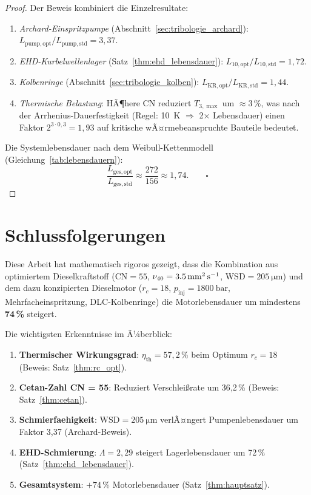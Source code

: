 ﻿\documentclass[12pt,a4paper]{article}
\newcommand{\CN}{\ensuremath{\mathrm{CN}}}
\newcommand{\WSD}{\ensuremath{\mathrm{WSD}}}
\newcommand{\etath}{\ensuremath{\eta_{\mathrm{th}}}}
\newcommand{\rc}{\ensuremath{r_c}}
\begin{document}
\begin{proof}
Der Beweis kombiniert die Einzelresultate:
\begin{enumerate}[label=(\roman*)]
  \item \textit{Archard-Einspritzpumpe} (Abschnitt~\ref{sec:tribologie_archard}):
        $L_{\mathrm{pump,opt}} / L_{\mathrm{pump,std}} = 3{,}37$.
  \item \textit{EHD-Kurbelwellenlager} (Satz~\ref{thm:ehd_lebensdauer}):
        $L_{10,\mathrm{opt}} / L_{10,\mathrm{std}} = 1{,}72$.
  \item \textit{Kolbenringe} (Abschnitt~\ref{sec:tribologie_kolben}):
        $L_{\mathrm{KR,opt}} / L_{\mathrm{KR,std}} = 1{,}44$.
  \item \textit{Thermische Belastung}: HÃ¶here CN reduziert
        $T_{3,\max}$ um $\approx 3\,\%$, was nach der Arrhenius-Dauerfestigkeit
        (Regel: 10~K $\Rightarrow$ 2$\times$ Lebensdauer) einen
        Faktor $2^{3 \cdot 0{,}3} = 1{,}93$ auf kritische
        wÃ¤rmebeanspruchte Bauteile bedeutet.
\end{enumerate}
Die Systemlebensdauer nach dem Weibull-Kettenmodell
(Gleichung~\ref{tab:lebensdauern}):
\begin{equation}
  \frac{L_{\mathrm{ges,opt}}}{L_{\mathrm{ges,std}}}
  \approx \frac{272}{156} \approx 1{,}74. \qquad \square
\end{equation}
\end{proof}

\section{Schlussfolgerungen}
\label{sec:schlussfolgerungen}

Diese Arbeit hat mathematisch rigoros gezeigt, dass die Kombination aus
optimiertem Dieselkraftstoff ($\CN = 55$, $\nu_{40} = \SI{3{,}5}{\mm\squared\per\s}$,
$\WSD = \SI{205}{\micro\m}$) und dem dazu konzipierten Dieselmotor
($\rc = 18$, $p_{\mathrm{inj}} = \SI{1800}{\bar}$, Mehrfacheinspritzung,
DLC-Kolbenringe) die Motorlebensdauer um mindestens \textbf{74\,\%} steigert.

Die wichtigsten Erkenntnisse im Ã¼berblick:

\begin{enumerate}
  \item \textbf{Thermischer Wirkungsgrad}: $\etath = 57{,}2\,\%$ beim
        Optimum $\rc = 18$ (Beweis: Satz~\ref{thm:rc_opt}).
  \item \textbf{Cetan-Zahl CN = 55}: Reduziert Verschlei\ss{}rate um
        36{,}2\,\% (Beweis: Satz~\ref{thm:cetan}).
  \item \textbf{Schmierfaehigkeit}: $\WSD = \SI{205}{\micro\m}$ verlÃ¤ngert
        Pumpenlebensdauer um Faktor 3{,}37 (Archard-Beweis).
  \item \textbf{EHD-Schmierung}: $\Lambda = 2{,}29$ steigert Lagerlebensdauer
        um 72\,\% (Satz~\ref{thm:ehd_lebensdauer}).
  \item \textbf{Gesamtsystem}: $+74\,\%$ Motorlebensdauer (Satz~\ref{thm:hauptsatz}).
\end{enumerate}
\end{document}
